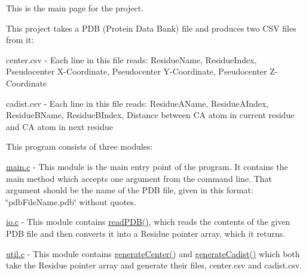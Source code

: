 This is the main page for the project.


\begin{DoxyEnumerate}
\item This project takes a P\+DB (Protein Data Bank) file and produces two C\+SV files from it\+:
\end{DoxyEnumerate}
\begin{DoxyItemize}
\item center.\+csv -\/ Each line in this file reads\+: Residue\+Name, Residue\+Index, Pseudocenter X-\/\+Coordinate, Pseudocenter Y-\/\+Coordinate, Pseudocenter Z-\/\+Coordinate
\item cadist.\+csv -\/ Each line in this file reads\+: Residue\+A\+Name, Residue\+A\+Index, Residue\+B\+Name, Residue\+B\+Index, Distance between CA atom in current residue and CA atom in next residue
\end{DoxyItemize}
\begin{DoxyEnumerate}
\item This program consists of three modules\+:
\end{DoxyEnumerate}
\begin{DoxyItemize}
\item \hyperlink{main_8c}{main.\+c} -\/ This module is the main entry point of the program. It contains the main method which accepts one argument from the command line. That argument should be the name of the P\+DB file, given in this format\+: \char`\"{}pdb\+File\+Name.\+pdb\char`\"{} without quotes.
\item \hyperlink{io_8c}{io.\+c} -\/ This module contains \hyperlink{io_8c_a0e8de96ba9834b755921d68a54169018}{read\+P\+D\+B()}, which reads the contents of the given P\+DB file and then converts it into a Residue pointer array, which it returns.
\item \hyperlink{util_8c}{util.\+c} -\/ This module contains \hyperlink{util_8c_a749f7c5e72d7b088403b739af84f080d}{generate\+Center()} and \hyperlink{util_8c_a8377fb7e5b8b960df60dbaf86e736e6c}{generate\+Cadist()} which both take the Residue pointer array and generate their files, center.\+csv and cadist.\+csv. 
\end{DoxyItemize}